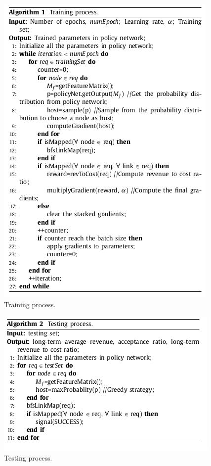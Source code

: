\documentclass[12pt]{article}
\begin{document}
\begin{figure}[t!] \label{alg:1}
	\includegraphics[width=\linewidth]{fig3}
	\caption{Training process.}
\end{figure}
\begin{figure}[t!] \label{alg:2}
	\includegraphics[width=\linewidth]{fig4}
	\caption{Testing process.}
\end{figure}
\end{document}
